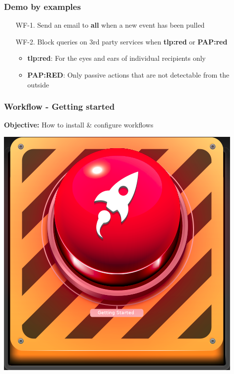 \begin{frame}
    \frametitle{Demo by examples}
    \begin{enumerate}
        \item[WF-1.] Send an email to \textbf{all} when a new event has been pulled
        \vspace*{2em}
        \item[WF-2.] Block queries on 3rd party services when \textbf{tlp:red} or \textbf{PAP:red}
        \begin{itemize}
            \item \textbf{tlp:red}: For the eyes and ears of individual recipients only
            \item \textbf{PAP:RED}: Only passive actions that are not detectable from the outside
        \end{itemize}
    \end{enumerate}
\end{frame}

\begin{frame}
    \frametitle{
        \huge
        \linebreak
        \linebreak
        \linebreak
        Workflow - Getting started
        \vspace{1em}
    }
    \textbf{Objective:} How to install \& configure workflows
    \begin{center}
        \includegraphics[width=0.2\linewidth]{pictures/getting-started}
    \end{center}
\end{frame}

